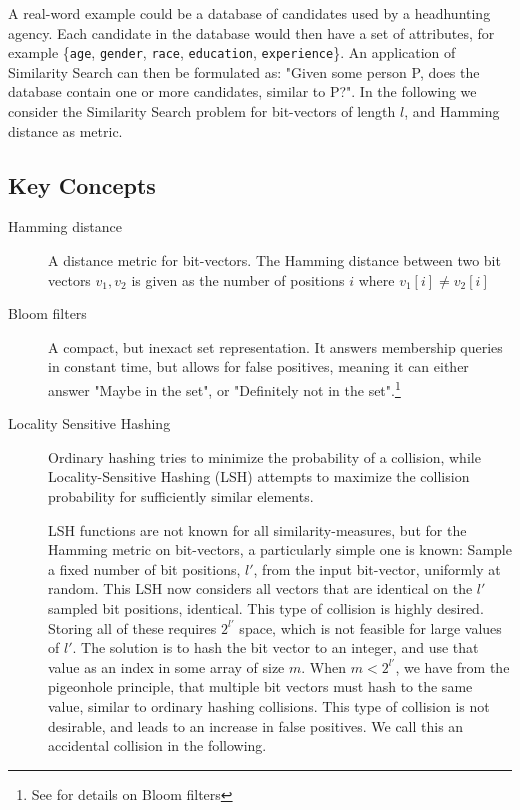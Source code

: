 \documentclass[a4paper,11pt]{article}
\begin{document}
A real-word example could be a database of candidates used by a headhunting agency. Each candidate in the database would then have a set of attributes, for example \{\texttt{age}, \texttt{gender}, \texttt{race}, \texttt{education}, \texttt{experience}\}.
An application of Similarity Search can then be formulated as: "Given some person P, does the database contain one or more candidates, similar to P?".
In the following we consider the Similarity Search problem for bit-vectors of length $l$, and Hamming distance as metric.

\subsection{Key Concepts}
\label{sec:lsh}
\begin{description}
\item[Hamming distance]

A distance metric for bit-vectors. The Hamming distance between two bit vectors $v_1, v_2$ is given as the number of positions $i$ where $v_1[i] \neq v_2[i]$

\item[Bloom filters]
A compact, but inexact set representation. It answers membership queries in constant time, but allows for false positives, meaning it can either answer "Maybe in the set", or "Definitely not in the set".\footnote{See \cite{paper:bloom} for details on Bloom filters}

\item[Locality Sensitive Hashing]
Ordinary hashing tries to minimize the probability of a collision, while Locality-Sensitive Hashing (LSH) attempts to maximize the collision probability for sufficiently similar elements.

LSH functions are not known for all similarity-measures, but for the Hamming metric on bit-vectors, a particularly simple one is known: Sample a fixed number of bit positions, $l'$, from the input bit-vector, uniformly at random.
This LSH now considers all vectors that are identical on the $l'$ sampled bit positions, identical. This type of collision is highly desired. Storing all of these requires $2^{l'}$ space, which is not feasible for large values of $l'$. The solution is to hash the bit vector to an integer, and use that value as an index in some array of size $m$. When $m < 2^{l'}$, we have from the pigeonhole principle, that multiple bit vectors must hash to the same value, similar to ordinary hashing collisions. This type of collision is not desirable, and leads to an increase in false positives. We call this an accidental collision in the following.
\end{description}
\end{document}

